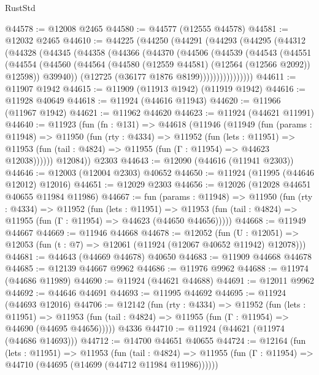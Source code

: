 \begin{lexlean}{RustStd}
\begin{coremodule}
@44578 := @12008 @2465
@44580 := @44577 (@12555 @44578)
@44581 := @12032 @2465
@44610 := @44225
    (@44250
      (@44291
        (@44293
          (@44295
            (@44312
              (@44328
                (@44345
                  (@44358
                    (@44366
                      (@44370
                        (@44506
                          (@44539
                            (@44543
                              (@44551
                                (@44554
                                  (@44560
                                    (@44564 (@44580 (@12559 @44581) (@12564 (@12566 @2092)) @12598))
                                    @39940))
                                (@12725 (@36177 @1876 @8199))))))))))))))))
@44611 := @11907 @1942
@44615 := @11909 (@11913 @1942) (@11919 @1942)
@44616 := @11928 @40649
@44618 := @11924 (@44616 @11943)
@44620 := @11966 (@11967 @1942)
@44621 := @11962 @44620
@44623 := @11924 (@44621 @11991)
@44640 := @11923
    (fun (fn : @131) =>
    @44618
      (@11946
        (@11949
          (fun (params : @11948) =>
          @11950
            (fun (rty : @4334) =>
            @11952
              (fun (lets : @11951) =>
              @11953 (fun (tail : @4824) => @11955 (fun (Γ : @11954) => @44623 @12038))))))
        @12084))
    @2303
@44643 := @12090 (@44616 (@11941 @2303))
@44646 := @12003 (@12004 @2303) @40652
@44650 := @11924 (@11995 (@44646 @12012) @12016)
@44651 := @12029 @2303
@44656 := @12026 (@12028 @44651 @40655 @11984 @11986)
@44667 := fun (params : @11948) =>
  @11950
    (fun (rty : @4334) =>
    @11952
      (fun (lets : @11951) =>
      @11953 (fun (tail : @4824) => @11955 (fun (Γ : @11954) => @44623 (@44650 @44656)))))
@44668 := @11949 @44667
@44669 := @11946 @44668
@44678 := @12052
    (fun (U : @12051) => @12053 (fun (t : @7) => @12061 (@11924 (@12067 @40652 @11942) @12078)))
@44681 := @44643 (@44669 @44678) @40650
@44683 := @11909 @44668 @44678
@44685 := @12139 @44667 @9962
@44686 := @11976 @9962
@44688 := @11974 (@44686 @11989)
@44690 := @11924 (@44621 @44688)
@44691 := @12011 @9962
@44692 := @44646 @44691
@44693 := @11995 @44692
@44695 := @11924 (@44693 @12016)
@44706 := @12142
    (fun (rty : @4334) =>
    @11952
      (fun (lets : @11951) =>
      @11953 (fun (tail : @4824) => @11955 (fun (Γ : @11954) => @44690 (@44695 @44656)))))
    @4336
@44710 := @11924 (@44621 (@11974 (@44686 @14693)))
@44712 := @14700 @44651 @40655
@44724 := @12164
    (fun (lets : @11951) =>
    @11953
      (fun (tail : @4824) =>
      @11955 (fun (Γ : @11954) => @44710 (@44695 (@14699 (@44712 @11984 @11986))))))

\end{coremodule}
\end{lexlean}
